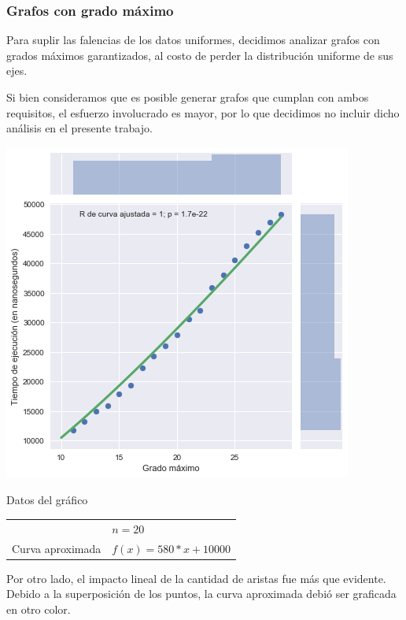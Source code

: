 \subsubsection*{Grafos con grado máximo}

Para suplir las falencias de los datos uniformes, decidimos analizar grafos con grados máximos garantizados, al costo de perder la distribución uniforme de sus ejes.

Si bien consideramos que es posible generar grafos que cumplan con ambos requisitos, el esfuerzo involucrado es mayor, por lo que decidimos no incluir dicho análisis en el presente trabajo.

\noindent
\begin{minipage}{0.55\textwidth}
    \hfill
    \includegraphics[scale=0.6]{img/greedy-alt-maxdeg.png}
\end{minipage}
\hfill
\begin{minipage}{0.44\textwidth}
    \begin{center}
        Datos del gráfico

        \begin{tabular}{ | l l |}
            \hline
             & $n = 20$\\ 
            Curva aproximada & $f(x) = 580 * x + 10000$ \\
            \hline
        \end{tabular}
    \end{center}
\end{minipage}

Por otro lado, el impacto lineal de la cantidad de aristas fue más que evidente. Debido a la superposición de los puntos, la curva aproximada debió ser graficada en otro color.
